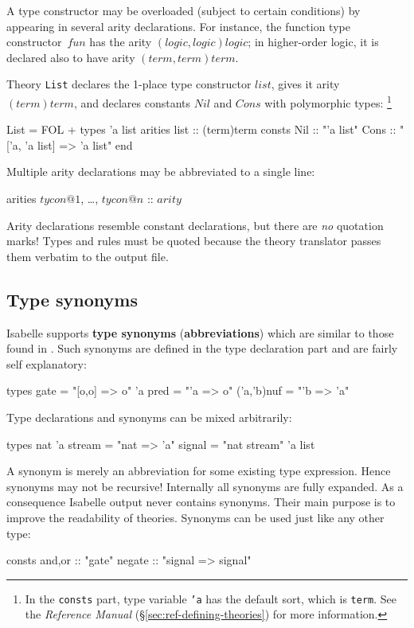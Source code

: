 A type constructor may be overloaded (subject to certain conditions) by
appearing in several arity declarations.  For instance, the function type
constructor~$fun$ has the arity $(logic,logic)logic$; in higher-order
logic, it is declared also to have arity $(term,term)term$.

Theory {\tt List} declares the 1-place type constructor $list$, gives
it arity $(term)term$, and declares constants $Nil$ and $Cons$ with
polymorphic types:%
\footnote{In the {\tt consts} part, type variable {\tt'a} has the default
  sort, which is {\tt term}.  See the {\em Reference Manual\/}
%
{(\S\ref{sec:ref-defining-theories})} for more information.}
\begin{ttbox}
List = FOL +
types   'a list
arities list    :: (term)term
consts  Nil     :: "'a list"
        Cons    :: "['a, 'a list] => 'a list" 
end
\end{ttbox}
Multiple arity declarations may be abbreviated to a single line:
\begin{ttbox}
arities \(tycon@1\), \ldots, \(tycon@n\) :: \(arity\)
\end{ttbox}

\begin{warn}
Arity declarations resemble constant declarations, but there are {\it no\/}
quotation marks!  Types and rules must be quoted because the theory
translator passes them verbatim to the {\ML} output file.
\end{warn}

\subsection{Type synonyms}
Isabelle supports {\bf type synonyms} ({\bf abbreviations}) which are similar
to those found in \ML.  Such synonyms are defined in the type declaration part
and are fairly self explanatory:
\begin{ttbox}
types gate       = "[o,o] => o"
      'a pred    = "'a => o"
      ('a,'b)nuf = "'b => 'a"
\end{ttbox}
Type declarations and synonyms can be mixed arbitrarily:
\begin{ttbox}
types nat
      'a stream = "nat => 'a"
      signal    = "nat stream"
      'a list
\end{ttbox}
A synonym is merely an abbreviation for some existing type expression.  Hence
synonyms may not be recursive!  Internally all synonyms are fully expanded.  As
a consequence Isabelle output never contains synonyms.  Their main purpose is
to improve the readability of theories.  Synonyms can be used just like any
other type:
\begin{ttbox}
consts and,or :: "gate"
       negate :: "signal => signal"
\end{ttbox}

